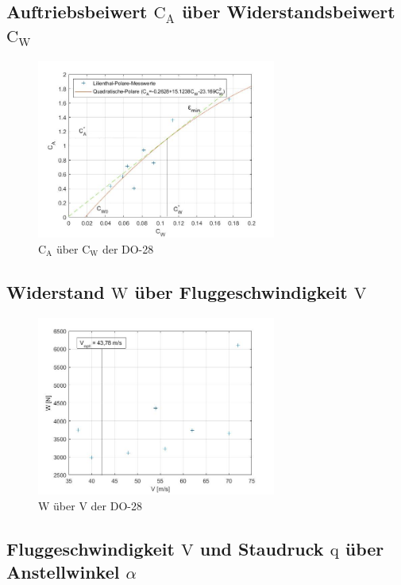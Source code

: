 \subsection{Auftriebsbeiwert $\mathrm{C}_{\mathrm{A}}$ über Widerstandsbeiwert $\mathrm{C}_{\mathrm{W}}$}

\begin{figure}[H]
	\centering	\includegraphics[width=0.7\textwidth]{./Bilder/CA_CW_DO28.jpg}
	\caption{$\mathrm{C}_{\mathrm{A}}$ über $\mathrm{C}_{\mathrm{W}}$ der DO-28}
	\label{fig:CA_CW_DO28}
\end{figure}

\subsection{Widerstand $\mathrm{W}$ über Fluggeschwindigkeit $\mathrm{V}$}

\begin{figure}[H]
	\centering	\includegraphics[width=0.7\textwidth]{./Bilder/W_V_DO28.jpg}
	\caption{$\mathrm{W}$ über $\mathrm{V}$ der DO-28}
	\label{fig:W_V_DO28}
\end{figure}


\subsection{Fluggeschwindigkeit $\mathrm{V}$ und Staudruck $\mathrm{q}$ über Anstellwinkel $\alpha$}

